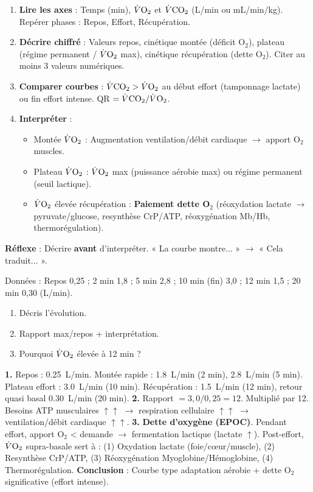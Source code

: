 \documentclass[11pt]{article}
\begin{document}
\begin{methode}
\begin{enumerate}
\item \textbf{Lire les axes} : Temps (min), $\dot{V}\ce{O2}$ et $\dot{V}\ce{CO2}$ (L/min ou mL/min/kg). Repérer phases : Repos, Effort, Récupération.
\item \textbf{Décrire chiffré} : Valeurs repos, cinétique montée (déficit O$_2$), plateau (régime permanent / $\dot{V}\ce{O2}$ max), cinétique récupération (dette O$_2$). Citer au moins 3 valeurs numériques.
\item \textbf{Comparer courbes} : $\dot{V}\ce{CO2} > \dot{V}\ce{O2}$ au début effort (tamponnage lactate) ou fin effort intense. QR $= \dot{V}\ce{CO2}/\dot{V}\ce{O2}$.
\item \textbf{Interpréter} :
\begin{itemize}
\item Montée $\dot{V}\ce{O2}$ : Augmentation ventilation/débit cardiaque $\rightarrow$ apport O$_2$ muscles.
\item Plateau $\dot{V}\ce{O2}$ : $\dot{V}\ce{O2}$ max (puissance aérobie max) ou régime permanent (seuil lactique).
\item $\dot{V}\ce{O2}$ élevée récupération : \textbf{Paiement dette O$_2$} (réoxydation lactate $\rightarrow$ pyruvate/glucose, resynthèse CrP/ATP, réoxygénation Mb/Hb, thermorégulation).
\end{itemize}
\end{enumerate}
\textbf{Réflexe} : Décrire \textbf{avant} d'interpréter. « La courbe montre... » $\rightarrow$ « Cela traduit... ».
\end{methode}

\begin{exoresolu}
Données : Repos 0,25 ; 2 min 1,8 ; 5 min 2,8 ; 10 min (fin) 3,0 ; 12 min 1,5 ; 20 min 0,30 (L/min).
\begin{enumerate}
\item Décris l'évolution.
\item Rapport max/repos + interprétation.
\item Pourquoi $\dot{V}\ce{O2}$ élevée à 12 min ?
\end{enumerate}
\tcblower
\textbf{1.} Repos : \SI{0,25}{L/min}. Montée rapide : \SI{1,8}{L/min} (2 min), \SI{2,8}{L/min} (5 min). Plateau effort : \SI{3,0}{L/min} (10 min). Récupération : \SI{1,5}{L/min} (12 min), retour quasi basal \SI{0,30}{L/min} (20 min).
\textbf{2.} Rapport $= 3,0 / 0,25 = 12$. Multiplié par 12. Besoins ATP musculaires $\uparrow \uparrow$ $\rightarrow$ respiration cellulaire $\uparrow \uparrow$ $\rightarrow$ ventilation/débit cardiaque $\uparrow \uparrow$.
\textbf{3.} \textbf{Dette d'oxygène (EPOC)}. Pendant effort, apport O$_2$ < demande $\rightarrow$ fermentation lactique (lactate $\uparrow$). Post-effort, $\dot{V}\ce{O2}$ supra-basale sert à : (1) Oxydation lactate (foie/cœur/muscle), (2) Resynthèse CrP/ATP, (3) Réoxygénation Myoglobine/Hémoglobine, (4) Thermorégulation.
\textbf{Conclusion} : Courbe type adaptation aérobie + dette O$_2$ significative (effort intense).
\end{exoresolu}
\end{document}
